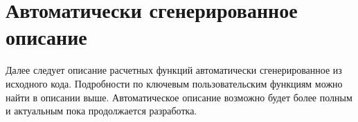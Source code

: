 \chapter{Автоматически сгенерированное описание}

Далее следует описание расчетных функций \unf{} автоматически сгенерированное из исходного кода.
Подробности по ключевым пользовательским функциям можно найти в описании выше. Автоматическое описание возможно будет более полным и актуальным пока продолжается разработка.